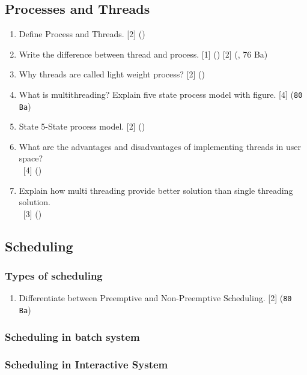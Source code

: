\documentclass[12pt]{article}
\newcommand{\enter}{\textcolor{white}{1}}\ExplSyntaxOn
\begin{document}
\subsection{Processes and Threads}
\begin{enumerate}[noitemsep, topsep = 0pt]
	\item Define Process and Threads. \hfill [2] ()
	
	\item Write the difference between thread and process. \hfill [1] () [2] (, 76 Ba)
	
	\item Why threads are called light weight process? \hfill [2] ()
	
	\item What is multithreading? Explain five state process model with figure. \hfill [4] (\texttt{80 Ba})
	
	\item State 5-State process model. \hfill [2] ()
	
	\item What are the advantages and disadvantages of implementing threads in user space?\\
	\enter \hfill [4] ()
	
	\item Explain how multi threading provide better solution than single threading solution.\\
	\enter \hfill [3] ()
\end{enumerate}
\subsection{Scheduling}
\subsubsection{Types of scheduling}
\begin{enumerate}[noitemsep, topsep = 0pt]
	\item Differentiate between Preemptive and Non-Preemptive Scheduling. \hfill [2] (\texttt{80 Ba})
\end{enumerate}
\subsubsection{Scheduling in batch system}
\subsubsection{Scheduling in Interactive System}
\end{document}
